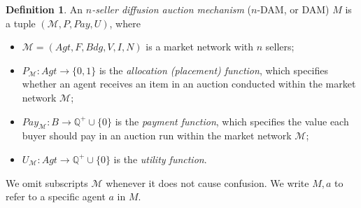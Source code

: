 \documentclass[letterpaper]{article} %
\theoremstyle{definition}
\newtheorem{definition}{Definition}
\newcommand{\Pay}{\mathit{Pay}}
\begin{document}
\begin{definition}
An \emph{$n$-seller diffusion auction mechanism} ($n$-DAM, or DAM) $M$ is a tuple $(\mathcal{M}, P, \Pay, U)$, where 
\begin{itemize}
    \item $\mathcal{M}=(Agt, F, Bdg, V, I, N)$ is a market network with $n$ sellers;
    \item $P_{\mathcal{M}}: Agt \to \{0,1\}$   is the \emph{allocation (placement) function}, which specifies whether an agent receives an item in an auction conducted within the market network $\mathcal{M}$;
    \item $\Pay_{\mathcal{M}}: B \to \mathbb{Q}^+ \cup \{0\}$  is the \emph{payment function},  which specifies the value each buyer should pay in an auction run within the market network $\mathcal{M}$;
    \item $U_{\mathcal{M}}: Agt \to \mathbb{Q}^+ \cup \{0\}$ is the \emph{utility function}.
\end{itemize}

We omit subscripts $\mathcal{M}$ whenever it does not cause confusion. We write $M,a$ to refer to a specific agent $a$ in $M$.
\end{definition}
\end{document}
